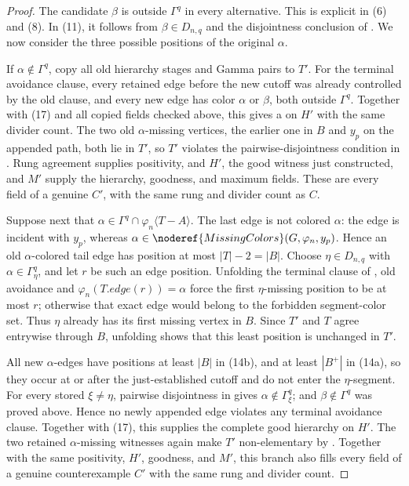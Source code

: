 \begin{proof}
The candidate \(\beta\) is outside \(\Gamma^q\) in every alternative.
This is explicit in (6) and (8).  In (11), it follows from
\(\beta\in D_{n,q}\) and the disjointness conclusion of
.  We now consider the three
possible positions of the original \(\alpha\).

If \(\alpha\notin\Gamma^q\), copy all old hierarchy stages and Gamma
pairs to \(T'\).  For the terminal avoidance clause, every retained edge
before the new cutoff was already controlled by the old clause, and every
new edge has color \(\alpha\) or \(\beta\), both outside \(\Gamma^q\).
Together with (17) and all copied fields checked above, this gives a
 on \(H'\) with the same divider count.
The two old \(\alpha\)-missing vertices, the
earlier one in \(B\) and \(y_p\) on the appended path, both lie in \(T'\),
so \(T'\) violates the pairwise-disjointness condition in
.  Rung agreement supplies positivity,
and \(H'\), the good witness just constructed, and \(M'\) supply the
hierarchy, goodness, and maximum fields.  These are every field of a
genuine  \(C'\), with the same rung and
divider count as \(C\).

Suppose next that
\(\alpha\in\Gamma^q\cap\varphi_n\langle T-A\rangle\).  The last edge is
not colored \(\alpha\): the edge is incident with \(y_p\), whereas
\(\alpha\in\noderef{MissingColors}(G,\varphi_n,y_p)\).  Hence an old
\(\alpha\)-colored tail edge has position at most \(|T|-2=|B|\).  Choose
\(\eta\in D_{n,q}\) with \(\alpha\in\Gamma^q_\eta\), and let \(r\) be
such an edge position.  Unfolding the terminal clause of
, old avoidance and
\(\varphi_n(T.\mathit{edge}(r))=\alpha\) force the first
\(\eta\)-missing position to be at most \(r\); otherwise that exact edge
would belong to the forbidden segment-color set.  Thus \(\eta\) already
has its first missing vertex in \(B\).  Since \(T'\) and \(T\) agree
entrywise through \(B\), unfolding
 shows that this least position is
unchanged in \(T'\).

All new \(\alpha\)-edges have positions at least \(|B|\) in (14b), and at
least \(|B^+|\) in (14a), so they occur at or after the just-established
cutoff and do not enter the \(\eta\)-segment.  For every stored
\(\xi\ne\eta\), pairwise disjointness in  gives
\(\alpha\notin\Gamma^q_\xi\); and \(\beta\notin\Gamma^q\) was proved
above.  Hence no newly appended edge violates any terminal avoidance
clause.  Together with (17), this supplies the complete good hierarchy on
\(H'\).  The two retained \(\alpha\)-missing witnesses again make \(T'\)
non-elementary by .  Together with
the same positivity, \(H'\), goodness, and \(M'\), this branch also fills
every field of a genuine counterexample \(C'\) with the same rung and
divider count.


\end{proof}
